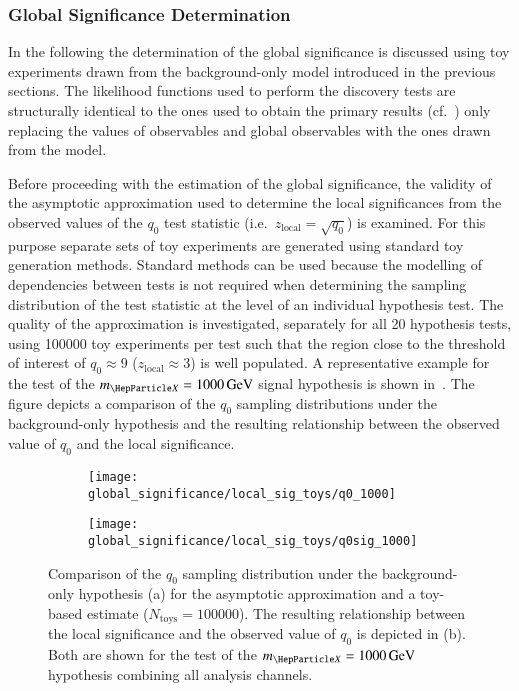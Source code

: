 \subsubsection{Global Significance Determination}

In the following the determination of the global significance is discussed using
toy experiments drawn from the background-only model introduced in the previous
sections. The likelihood functions used to perform the discovery tests are
structurally identical to the ones used to obtain the primary results (cf.\
) only replacing the values of observables and
global observables with the ones drawn from the model.

Before proceeding with the estimation of the global significance, the validity
of the asymptotic approximation used to determine the local significances from
the observed values of the $q_0$ test statistic (i.e.\
$z_{\text{local}} = \sqrt{q_0}$) is examined. For this purpose separate sets of
toy experiments are generated using standard toy generation methods. Standard
methods can be used because the modelling of dependencies between tests is not
required when determining the sampling distribution of the test statistic at the
level of an individual hypothesis test. The quality of the approximation is
investigated, separately for all 20 hypothesis tests, using \num{100000} toy
experiments per test such that the region close to the threshold of interest of
$q_0 \approx 9$ ($z_{\text{local}} \approx 3$) is well populated. A
representative example for the test of the $\mX = \SI{1000}{\GeV}$ signal
hypothesis is shown in~\Cref{fig:q0_samplingdist}. The figure depicts a
comparison of the $q_0$ sampling distributions under the background-only
hypothesis and the resulting relationship between the observed value of $q_0$
and the local significance.

\begin{figure}[htbp]
  \centering

  \begin{subfigure}{0.485\textwidth}
    \centering

    \texttt{[image: global\_significance/local\_sig\_toys/q0\_1000]}
    \subcaption{}
  \end{subfigure}\hfill%
  \begin{subfigure}{0.485\textwidth}
    \centering
    \texttt{[image: global\_significance/local\_sig\_toys/q0sig\_1000]}
    \subcaption{}%
    \label{fig:q0_samplingdist_q0sig}
  \end{subfigure}

  \caption{Comparison of the $q_0$ sampling distribution under the
    background-only hypothesis (a) for the asymptotic approximation and a
    toy-based estimate ($N_{\text{toys}} = \num{100000}$). The resulting
    relationship between the local significance and the observed value of $q_0$
    is depicted in (b). Both are shown for the test of the
    $\mX = \SI{1000}{\GeV}$ hypothesis combining all analysis channels.}%
  \label{fig:q0_samplingdist}
\end{figure}

